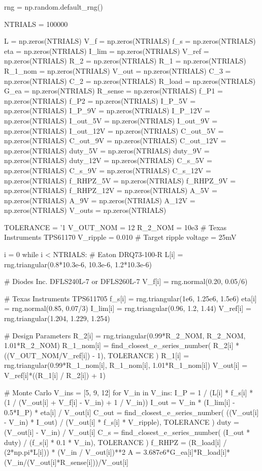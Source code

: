 \documentclass[12pt, titlepage]{/home/air/projects/latex-template/tex-template}
\begin{document}
\begin{pycode}

rng = np.random.default_rng()

NTRIALS = 100000

L = np.zeros(NTRIALS)
V_f = np.zeros(NTRIALS)
f_s = np.zeros(NTRIALS)
eta = np.zeros(NTRIALS)
I_lim = np.zeros(NTRIALS)
V_ref = np.zeros(NTRIALS)
R_2 = np.zeros(NTRIALS)
R_1 = np.zeros(NTRIALS)
R_1_nom = np.zeros(NTRIALS)
V_out = np.zeros(NTRIALS)
C_3 = np.zeros(NTRIALS)
C_2 = np.zeros(NTRIALS)
R_load = np.zeros(NTRIALS)
G_ea = np.zeros(NTRIALS)
R_sense = np.zeros(NTRIALS)
f_P1 = np.zeros(NTRIALS)
f_P2 = np.zeros(NTRIALS)
I_P_5V = np.zeros(NTRIALS)
I_P_9V = np.zeros(NTRIALS)
I_P_12V = np.zeros(NTRIALS)
I_out_5V = np.zeros(NTRIALS)
I_out_9V = np.zeros(NTRIALS)
I_out_12V = np.zeros(NTRIALS)
C_out_5V = np.zeros(NTRIALS)
C_out_9V = np.zeros(NTRIALS)
C_out_12V = np.zeros(NTRIALS)
duty_5V = np.zeros(NTRIALS)
duty_9V = np.zeros(NTRIALS)
duty_12V = np.zeros(NTRIALS)
C_s_5V = np.zeros(NTRIALS)
C_s_9V = np.zeros(NTRIALS)
C_s_12V = np.zeros(NTRIALS)
f_RHPZ_5V = np.zeros(NTRIALS)
f_RHPZ_9V = np.zeros(NTRIALS)
f_RHPZ_12V = np.zeros(NTRIALS)
A_5V = np.zeros(NTRIALS)
A_9V = np.zeros(NTRIALS)
A_12V = np.zeros(NTRIALS)
V_outs = np.zeros(NTRIALS)

TOLERANCE = '1%
V_OUT_NOM = 12
R_2_NOM = 10e3  # Texas Instruments TPS61170
V_ripple = 0.010  # Target ripple voltage = 25mV

i = 0
while i < NTRIALS:
    # Eaton DRQ73-100-R
    L[i] = rng.triangular(0.8*10.3e-6, 10.3e-6, 1.2*10.3e-6)

    # Diodes Inc. DFLS240L-7 or DFLS260L-7
    V_f[i] = rng.normal(0.20, 0.05/6)

    # Texas Instruments TPS611705
    f_s[i] = rng.triangular(1e6, 1.25e6, 1.5e6)
    eta[i] = rng.normal(0.85, 0.07/3)
    I_lim[i] = rng.triangular(0.96, 1.2, 1.44)
    V_ref[i] = rng.triangular(1.204, 1.229, 1.254)

    # Design Parameters
    R_2[i] = rng.triangular(0.99*R_2_NOM, R_2_NOM, 1.01*R_2_NOM)
    R_1_nom[i] = find_closest_e_series_number(
        R_2[i] * ((V_OUT_NOM/V_ref[i]) - 1),
        TOLERANCE
        )
    R_1[i] = rng.triangular(0.99*R_1_nom[i], R_1_nom[i], 1.01*R_1_nom[i])
    V_out[i] = V_ref[i]*((R_1[i] / R_2[i]) + 1)

    # Monte Carlo
    V_ins = [5, 9, 12]
    for V_in in V_ins:
        I_P = 1 / (L[i] * f_s[i] * (1 / (V_out[i] + V_f[i] - V_in) + 1 / V_in))
        I_out = V_in * (I_lim[i] - 0.5*I_P) * eta[i] / V_out[i]
        C_out = find_closest_e_series_number(
            ((V_out[i] - V_in) * I_out) / (V_out[i] * f_s[i] * V_ripple),
            TOLERANCE
            )
        duty = (V_out[i] - V_in) / V_out[i]
        C_s = find_closest_e_series_number(
            (I_out * duty) / (f_s[i] * 0.1 * V_in),
            TOLERANCE
            )
        f_RHPZ = (R_load[i] / (2*np.pi*L[i])) * (V_in / V_out[i])**2
        A = 3.687e6*G_ea[i]*R_load[i]*(V_in/(V_out[i]*R_sense[i]))/V_out[i]


\end{pycode}
\end{document}
